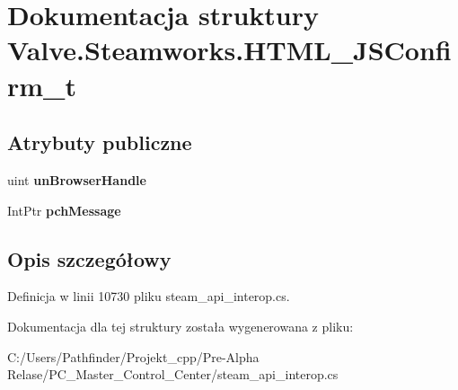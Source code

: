 \hypertarget{struct_valve_1_1_steamworks_1_1_h_t_m_l___j_s_confirm__t}{}\section{Dokumentacja struktury Valve.\+Steamworks.\+H\+T\+M\+L\+\_\+\+J\+S\+Confirm\+\_\+t}
\label{struct_valve_1_1_steamworks_1_1_h_t_m_l___j_s_confirm__t}
\subsection*{Atrybuty publiczne}
\begin{DoxyCompactItemize}
\item 
\mbox{\label{struct_valve_1_1_steamworks_1_1_h_t_m_l___j_s_confirm__t_a75f8f1ce33390668a41dbbb4f34a9f4d}} 
uint {\bfseries un\+Browser\+Handle}
\item 
\mbox{\label{struct_valve_1_1_steamworks_1_1_h_t_m_l___j_s_confirm__t_af786600bc0cc3980ef334b43886caf5d}} 
Int\+Ptr {\bfseries pch\+Message}
\end{DoxyCompactItemize}


\subsection{Opis szczegółowy}


Definicja w linii 10730 pliku steam\+\_\+api\+\_\+interop.\+cs.



Dokumentacja dla tej struktury została wygenerowana z pliku\+:\begin{DoxyCompactItemize}
\item 
C\+:/\+Users/\+Pathfinder/\+Projekt\+\_\+cpp/\+Pre-\/\+Alpha Relase/\+P\+C\+\_\+\+Master\+\_\+\+Control\+\_\+\+Center/steam\+\_\+api\+\_\+interop.\+cs\end{DoxyCompactItemize}
